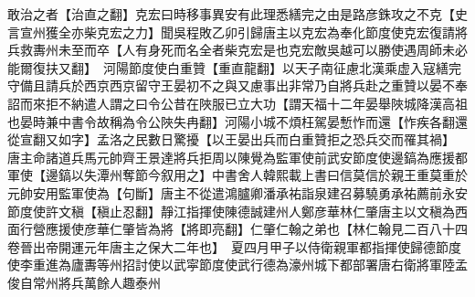 敢治之者【治直之翻】克宏曰時移事異安有此理悉繕完之由是路彦銖攻之不克【史言宣州獲全亦柴克宏之力】聞吳程敗乙卯引歸唐主以克宏為奉化節度使克宏復請將兵救夀州未至而卒【人有身死而名全者柴克宏是也克宏敵吳越可以勝使遇周師未必能爾復扶又翻】　河陽節度使白重贊【重直龍翻】以天子南征慮北漢乘虚入寇繕完守備且請兵於西京西京留守王晏初不之與又慮事出非常乃自將兵赴之重贊以晏不奉詔而來拒不納遣人謂之曰令公昔在陜服已立大功【謂天福十二年晏舉陜城降漢高祖也晏時兼中書令故稱為令公陜失冉翻】河陽小城不煩枉駕晏慙怍而還【怍疾各翻還從宣翻又如字】孟洛之民數日驚擾【以王晏出兵而白重贊拒之恐兵交而罹其禍】　唐主命諸道兵馬元帥齊王景達將兵拒周以陳覺為監軍使前武安節度使邊鎬為應援都軍使【邊鎬以失潭州奪節今叙用之】中書舍人韓熙載上書曰信莫信於親王重莫重於元帥安用監軍使為【句斷】唐主不從遣鴻臚卿潘承祐詣泉建召募驍勇承祐薦前永安節度使許文稹【稹止忍翻】靜江指揮使陳德誠建州人鄭彦華林仁肇唐主以文稹為西面行營應援使彦華仁肇皆為將【將即亮翻】仁肇仁翰之弟也【林仁翰見二百八十四卷晉出帝開運元年唐主之保大二年也】　夏四月甲子以侍衛親軍都指揮使歸德節度使李重進為廬夀等州招討使以武寜節度使武行德為濠州城下都部署唐右衛將軍陸孟俊自常州將兵萬餘人趣泰州

